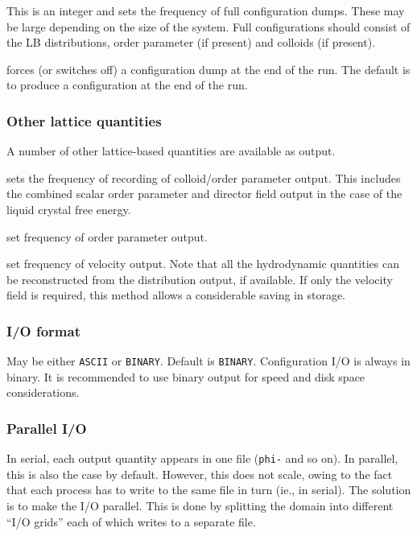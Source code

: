 
This is an integer and sets the frequency of full configuration dumps.
These may be large depending on the size of the system.
Full configurations should consist of the LB distributions,
order parameter (if present) and colloids (if present).



forces (or switches off) a configuration dump at the end of the run.
The default is to produce a configuration at the end of the run.

\subsubsection{Other lattice quantities}

A number of other lattice-based quantities are available as output.


sets the frequency of recording of colloid/order parameter output.
This includes the combined scalar order parameter and director
field output in the case of the liquid crystal free energy.


set frequency of order parameter output.


set frequency of velocity output. Note that all the hydrodynamic
quantities can be reconstructed from the distribution output, if
available. If only the velocity field is required, this method
allows a considerable saving in storage.


\subsubsection{I/O format}




May be either \texttt{ASCII} or \texttt{BINARY}. Default is \texttt{BINARY}.
Configuration I/O is always in binary. It is recommended to use
binary output for speed and disk space considerations.

\subsubsection{Parallel I/O}

In serial, each output quantity appears in one file (\texttt{phi-}
and so on). In parallel, this is also the case by default. However,
this does not scale, owing to the fact that each process has to
write to the same file in turn (ie., in serial). The solution is
to make the I/O parallel. This is done by splitting the domain into
different ``I/O grids'' each of which writes to a separate file.

